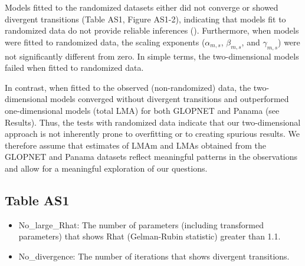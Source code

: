 \documentclass[
  12pt,
  letterpaper,
  DIV=11,
  numbers=noendperiod]{scrartcl}
\numberwithin{equation}{section}
\begin{document}
Models fitted to the randomized datasets either did not converge or
showed divergent transitions (Table AS1, Figure AS1-2), indicating that
models fit to randomized data do not provide reliable inferences
(). Furthermore, when
models were fitted to randomized data, the scaling exponents
(\(\alpha_{m,s}\), \(\beta_{m,s}\), and \(\gamma_{m,s}\)) were not
significantly different from zero. In simple terms, the two-dimensional
models failed when fitted to randomized data.

In contrast, when fitted to the observed (non-randomized) data, the
two-dimensional models converged without divergent transitions and
outperformed one-dimensional models (total LMA) for both GLOPNET and
Panama (see Results). Thus, the tests with randomized data indicate that
our two-dimensional approach is not inherently prone to overfitting or
to creating spurious results. We therefore assume that estimates of LMAm
and LMAs obtained from the GLOPNET and Panama datasets reflect
meaningful patterns in the observations and allow for a meaningful
exploration of our questions.

\subsection{Table AS1}\label{table-as1}

\begin{itemize}
\item
  No\_large\_Rhat: The number of parameters (including transformed
  parameters) that shows Rhat (Gelman-Rubin statistic) greater than 1.1.
\item
  No\_divergence: The number of iterations that shows divergent
  transitions.
\end{itemize}
\end{document}
